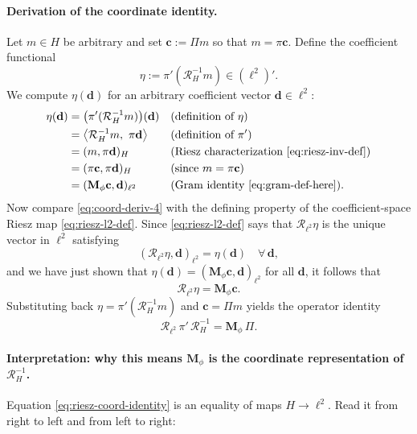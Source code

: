 \documentclass[11pt,twoside,openright]{book}
\theoremstyle{plain}
\theoremstyle{definition}
\theoremstyle{remark}
\newcommand{\Riesz}{\mathcal{R}}
\begin{document}
\paragraph{Derivation of the coordinate identity.}
Let $m\in H$ be arbitrary and set $\mathbf{c}:=\Pi m$ so that $m=\pi\mathbf{c}$.
Define the coefficient functional
\[
\eta := \pi'(\Riesz_H^{-1} m)\in(\ell^2)'.
\]
We compute $\eta(\mathbf{d})$ for an arbitrary coefficient vector
$\mathbf{d}\in\ell^2$:
\begin{align}
\eta(\mathbf{d})
&= \bigl(\pi'(\Riesz_H^{-1} m)\bigr)(\mathbf{d})
&& \text{(definition of $\eta$)} \nonumber\\
&= \left\langle \Riesz_H^{-1} m,\ \pi\mathbf{d}\right\rangle
&& \text{(definition of $\pi'$)} \label{eq:coord-deriv-1}\\
&= (m,\pi\mathbf{d})_H
&& \text{(Riesz characterization \eqref{eq:riesz-inv-def})} \label{eq:coord-deriv-2}\\
&= (\pi\mathbf{c},\pi\mathbf{d})_H
&& \text{(since $m=\pi\mathbf{c}$)} \label{eq:coord-deriv-3}\\
&= (\mathbf{M}_\phi\mathbf{c},\mathbf{d})_{\ell^2}
&& \text{(Gram identity \eqref{eq:gram-def-here}).} \label{eq:coord-deriv-4}
\end{align}
Now compare \eqref{eq:coord-deriv-4} with the defining property of the
coefficient-space Riesz map \eqref{eq:riesz-l2-def}.
Since \eqref{eq:riesz-l2-def} says that $\Riesz_{\ell^2}\eta$ is the unique
vector in $\ell^2$ satisfying
\[
(\Riesz_{\ell^2}\eta,\mathbf{d})_{\ell^2}=\eta(\mathbf{d})\quad\forall\,\mathbf{d},
\]
and we have just shown that $\eta(\mathbf{d})=(\mathbf{M}_\phi\mathbf{c},\mathbf{d})_{\ell^2}$
for all $\mathbf{d}$, it follows that
\[
\Riesz_{\ell^2}\eta = \mathbf{M}_\phi \mathbf{c}.
\]
Substituting back $\eta=\pi'(\Riesz_H^{-1} m)$ and $\mathbf{c}=\Pi m$ yields the
operator identity
\begin{equation}
\label{eq:riesz-coord-identity}
\boxed{
\Riesz_{\ell^2}\,\pi'\,\Riesz_H^{-1}
=
\mathbf{M}_\phi\,\Pi.
}
\end{equation}

\paragraph{Interpretation: why this means $\mathbf{M}_\phi$ is the coordinate representation of $\Riesz_H^{-1}$.}
Equation \eqref{eq:riesz-coord-identity} is an equality of maps $H\to \ell^2$.
Read it from right to left and from left to right:
\end{document}
